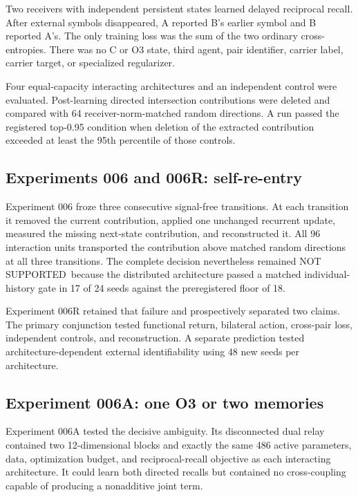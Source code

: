 \documentclass[11pt,a4paper]{article}
\newcommand{\statusnotsupported}{\textsf{NOT SUPPORTED}}
\begin{document}
Two receivers with independent persistent states learned delayed reciprocal recall. After external symbols disappeared, A reported B's earlier symbol and B reported A's. The only training loss was the sum of the two ordinary cross-entropies. There was no C or O3 state, third agent, pair identifier, carrier label, carrier target, or specialized regularizer.

Four equal-capacity interacting architectures and an independent control were evaluated. Post-learning directed intersection contributions were deleted and compared with 64 receiver-norm-matched random directions. A run passed the registered top-0.95 condition when deletion of the extracted contribution exceeded at least the 95th percentile of those controls.

\subsection{Experiments 006 and 006R: self-re-entry}

Experiment 006 froze three consecutive signal-free transitions. At each transition it removed the current contribution, applied one unchanged recurrent update, measured the missing next-state contribution, and reconstructed it. All 96 interaction units transported the contribution above matched random directions at all three transitions. The complete decision nevertheless remained \statusnotsupported\ because the distributed architecture passed a matched individual-history gate in 17 of 24 seeds against the preregistered floor of 18.

Experiment 006R retained that failure and prospectively separated two claims. The primary conjunction tested functional return, bilateral action, cross-pair loss, independent controls, and reconstruction. A separate prediction tested architecture-dependent external identifiability using 48 new seeds per architecture.

\subsection{Experiment 006A: one O3 or two memories}

Experiment 006A tested the decisive ambiguity. Its disconnected dual relay contained two 12-dimensional blocks and exactly the same 486 active parameters, data, optimization budget, and reciprocal-recall objective as each interacting architecture. It could learn both directed recalls but contained no cross-coupling capable of producing a nonadditive joint term.
\end{document}
